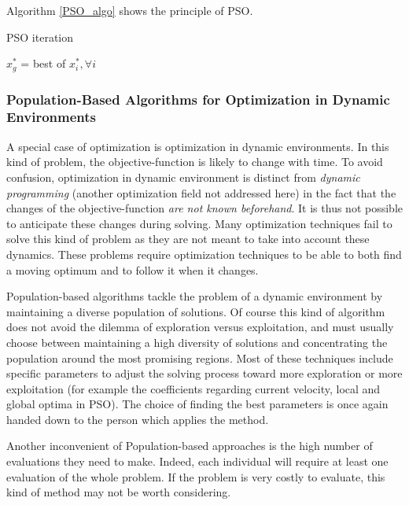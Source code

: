 Algorithm \ref{PSO_algo} shows the principle of PSO.

\begin{algorithm}
\caption{PSO iteration}\label{PSO_algo}

	$x_g^*$ = best of $x_i^*, \forall i$\;

\end{algorithm}

\subsubsection{Population-Based Algorithms for Optimization in Dynamic Environments}\label{population_based}

A special case of optimization is optimization in dynamic environments. In this kind of problem, the objective-function is likely to change with time. To avoid confusion, optimization in dynamic environment is distinct from \emph{dynamic programming} (another optimization field not addressed here) in the fact that the changes of the objective-function \emph{are not known beforehand}. It is thus not possible to anticipate these changes during solving.
Many optimization techniques fail to solve this kind of problem as they are not meant to take into account these dynamics. These problems require optimization techniques to be able to both find a moving optimum and to follow it when it changes.

Population-based algorithms tackle the problem of a dynamic environment by maintaining a diverse population of solutions. Of course this kind of algorithm does not avoid the dilemma of exploration versus exploitation, and must usually choose between maintaining a high diversity of solutions and concentrating the population around the most promising regions. Most of these techniques include specific parameters to adjust the solving process toward more exploration or more exploitation (for example the coefficients regarding current velocity, local and global optima in PSO). The choice of finding the best parameters is once again handed down to the person which applies the method.

Another inconvenient of Population-based approaches is the high number of evaluations they need to make. Indeed, each individual will require at least one evaluation of the whole problem. If the problem is very costly to evaluate, this kind of method may not be worth considering.

